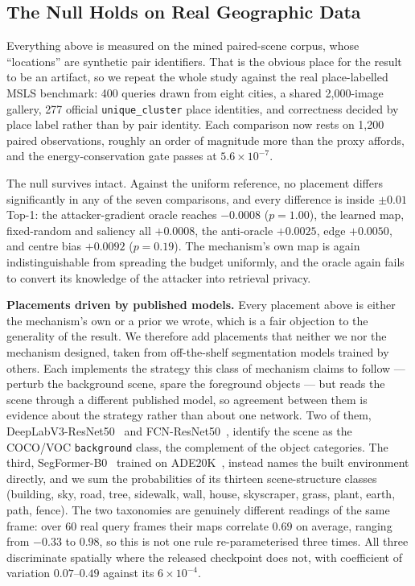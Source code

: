 \documentclass[10pt,journal]{IEEEtran}
\begin{document}
\subsection{The Null Holds on Real Geographic Data}
\label{sec:msls_placement}

Everything above is measured on the mined paired-scene corpus, whose
``locations'' are synthetic pair identifiers. That is the obvious place for
the result to be an artifact, so we repeat the whole study against the real
place-labelled MSLS benchmark: 400 queries drawn from eight cities, a shared
2,000-image gallery, 277 official \texttt{unique\_cluster} place identities,
and correctness decided by place label rather than by pair identity. Each
comparison now rests on 1,200 paired observations, roughly an order of
magnitude more than the proxy affords, and the energy-conservation gate passes
at $5.6\times10^{-7}$.

The null survives intact. Against the uniform reference, no placement differs
significantly in any of the seven comparisons, and every difference is inside
$\pm0.01$ Top-1: the attacker-gradient oracle reaches $-0.0008$ ($p=1.00$),
the learned map, fixed-random and saliency all $+0.0008$, the anti-oracle
$+0.0025$, edge $+0.0050$, and centre bias $+0.0092$ ($p=0.19$). The
mechanism's own map is again indistinguishable from spreading the budget
uniformly, and the oracle again fails to convert its knowledge of the
attacker into retrieval privacy.

\textbf{Placements driven by published models.} Every placement above is
either the mechanism's own or a prior we wrote, which is a fair objection to
the generality of the result. We therefore add placements that neither we nor
the mechanism designed, taken from off-the-shelf segmentation models trained
by others. Each implements the strategy this class of mechanism claims to
follow --- perturb the background scene, spare the foreground objects --- but
reads the scene through a different published model, so agreement between them
is evidence about the strategy rather than about one network. Two of them,
DeepLabV3-ResNet50~\cite{chen2017rethinking} and
FCN-ResNet50~\cite{long2015fully}, identify the scene as the COCO/VOC
\texttt{background} class, the complement of the object categories. The third,
SegFormer-B0~\cite{xie2021segformer} trained on ADE20K~\cite{zhou2017scene},
instead names the built environment directly,
and we sum the probabilities of its thirteen scene-structure classes
(building, sky, road, tree, sidewalk, wall, house, skyscraper, grass, plant,
earth, path, fence). The two taxonomies are genuinely different readings of
the same frame: over 60 real query frames their maps correlate $0.69$ on
average, ranging from $-0.33$ to $0.98$, so this is not one rule
re-parameterised three times. All three
discriminate spatially where the released checkpoint does not, with
coefficient of variation $0.07$--$0.49$ against its $6\times10^{-4}$.
\end{document}
